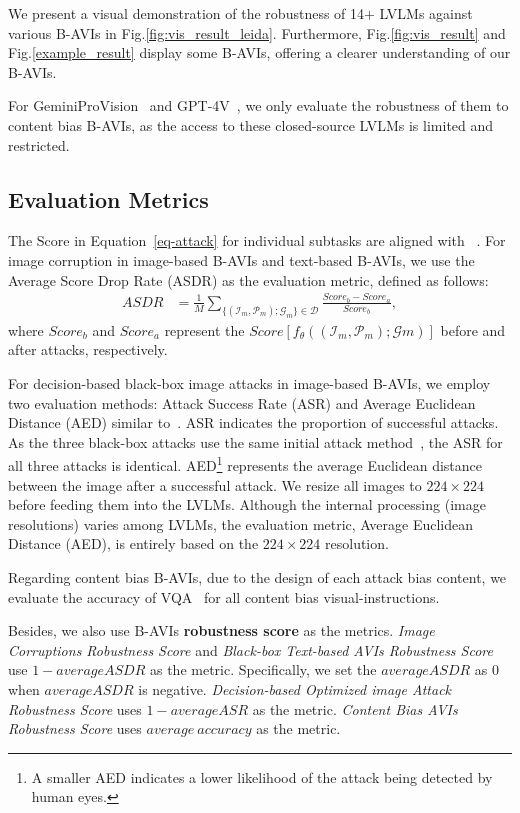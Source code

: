 We present a visual demonstration of the robustness of 14$+$ LVLMs against various B-AVIs in Fig.\ref{fig:vis_result_leida}. Furthermore, Fig.\ref{fig:vis_result} and Fig.\ref{example_result} display some B-AVIs, offering a clearer understanding of our B-AVIs. 

For GeminiProVision~\cite{team2023gemini} and GPT-4V~\cite{OpenAI2023GPT4TR}, we only evaluate the robustness of them to content bias B-AVIs, as the access to these closed-source LVLMs is limited and restricted.

\subsection{Evaluation Metrics}
\label{4-a}

The $\text{Score}$ in Equation~\ref{eq-attack} for individual subtasks are aligned with ~\cite{xu2023lvlm,shao2023tiny}.
For image corruption in image-based B-AVIs and text-based B-AVIs, we use the Average Score Drop Rate (ASDR) as the evaluation metric, defined as follows:
\begin{align}
ASDR&=\frac{1}{M}\sum_{\{(\mathcal{I}_m,\mathcal{P}_m); \mathcal{G}_{m}\}\in \mathcal{D}} \frac{Score_b- Score_a}{{Score}_b},
\end{align}
where $Score_b$ and $Score_a$ represent the $Score[f_\theta({(\mathcal{I}_m,\mathcal{P}_m); \mathcal{G}{m}})]$ before and after attacks, respectively.

For decision-based black-box image attacks in image-based B-AVIs, we employ two evaluation methods: Attack Success Rate (ASR) and Average Euclidean Distance (AED) similar to~\cite{shi2022decision}. ASR indicates the proportion of successful attacks. As the three black-box attacks use the same initial attack method~\cite{shi2022decision}, the ASR for all three attacks is identical. AED\footnote{A smaller AED indicates a lower likelihood of the attack being detected by human eyes.} represents the average Euclidean distance between the image after a successful attack. We resize all images to $224\times224$ before feeding them into the LVLMs. Although the internal processing (image resolutions) varies among LVLMs, the evaluation metric, Average Euclidean Distance (AED), is entirely based on the $224\times224$ resolution.

Regarding content bias B-AVIs, due to the design of each attack bias content, we evaluate the accuracy of VQA~\cite{xu2023lvlm} for all content bias visual-instructions.

Besides, we also use B-AVIs \textbf{robustness score} as the metrics.
\textit{Image Corruptions Robustness Score} and \textit{Black-box Text-based AVIs Robustness Score} use $1- average ASDR$ as the metric. Specifically, we set the $average ASDR$ as 0 when $average ASDR$ is negative.
\textit{Decision-based Optimized image Attack Robustness Score} uses $1-average ASR$ as the metric.
\textit{Content Bias AVIs Robustness Score} uses $average\ accuracy$ as the metric.


